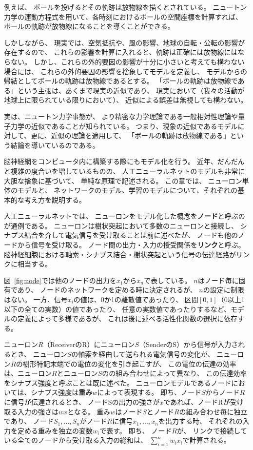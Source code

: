 例えば、
ボールを投げるとその軌跡は放物線を描くとされている。
ニュートン力学の運動方程式を用いて、各時刻におけるボールの空間座標を計算すれば、
ボールの軌跡が放物線になることを導くことができる。

しかしながら、
現実では、空気抵抗や、風の影響、地球の自転・公転の影響が存在するので、
これらの影響を計算に入れると、軌跡は正確には放物線にはならない。
しかし、これらの外的要因の影響が十分に小さいと考えても構わない場合には、
これらの外的要因の影響を捨象してモデルを定義し、
モデルからの帰結としてボールの軌跡は放物線であるとする。
「ボールの軌跡は放物線である」という主張は、あくまで現実の近似であり、
現実において（我々の活動が地球上に限られている限りにおいて）、
近似による誤差は無視しても構わない。

実は、ニュートン力学事態が、
より精密な力学理論である一般相対性理論や量子力学の近似であることが知られている。
つまり、現象の近似であるモデルに対して、更に、近似の理論を適用して、
「ボールの軌跡は放物線である」という結論を導いているのである。

脳神経網をコンピュータ内に構築する際にもモデル化を行う。
近年、だんだんと複雑の度合いを増しているものの、
人工ニューラルネットのモデルも非常に大胆な捨象に基づいて、
単純な原理で記述される。
この章では、
ニューロン単体のモデルと、
ネットワークのモデル、学習のモデルについて、それぞれの基本的な考え方を説明する。

人工ニューラルネットでは、
ニューロンをモデル化した概念を\textbf{ノード}と呼ぶのが通例である。
ニューロンは樹状突起において多数のニューロンと接続し、
シナプス結合を介して電気信号を受け取ることは前に述べたが、
ノードも他のノードから信号を受け取る。
ノード間の出力・入力の授受関係を\textbf{リンク}と呼ぶ。
脳神経細胞における軸索・シナプス結合・樹状突起という信号の伝達経路がリンクに相当する。

図~\ref{fig:node}では他のノードの出力を$x_1$から$x_n$で表している。
$n$はノード毎に固有であり、
ノードのネットワークを定める時に決定されるが、
$n$の設定に制限はない。
一方、信号$x_i$の値は、0か1の離散値であったり、
区間$[0, 1]$（0以上1以下の全ての実数）の値であったり、
任意の実数値であったりするなど、モデルの定義によって多様であるが、
これは後に述べる活性化関数の選択に依存する。

ニューロン$R$（ReceiverのR）にニューロン$S$（SenderのS）から信号が入力されるとき、
ニューロン$S$の軸索を経由して送られる電気信号の変化が、
ニューロン$R$の樹形特記末端での電位の変化を引き起こすが、
この電位の伝達の効率は、ニューロン$R$とニューロン$S$のの組み合わせによって異なり、
この伝達効率をシナプス強度と呼ぶことは既に述べた。
ニューロンモデルであるノードにおいては、シナプス強度は\textbf{重み}$w$によって表現する。
即ち、ノード$S$からノード$R$に信号が伝達されるとき、
ノードSの出力の強さが$x$であれば、ノードRが受け取る入力の強さは$wx$となる。
重み$w$はノード$S$とノード$R$の組み合わせ毎に独立であり、
ノード$S_1, \dots, S_n$がノード$R$に信号$x_1, \dots, x_n$を出力する時、
それぞれの入力を定める重みを独立の変数$w_i$で表す。
即ち、
ノード$R$が、
リンクで接続している全てのノードから受け取る入力の総和は、
$\displaystyle \sum_{i=1}^n w_ix_i$で計算される。

